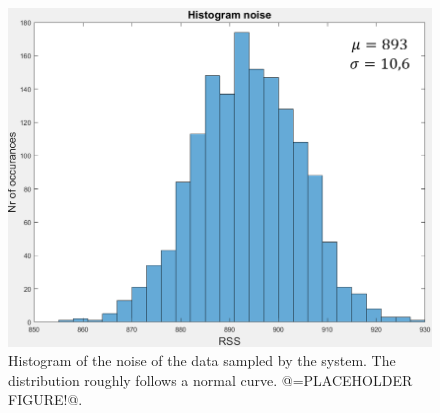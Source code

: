 \begin{figure}[!h]
	\includegraphics[width=\textwidth]{pics/histogram_noise_placeholder.png}
	\caption{Histogram of the noise of the data sampled by the system. The distribution roughly follows a normal curve. @=PLACEHOLDER FIGURE!@.}
	\label{fig:histogram_noise}
\end{figure}

